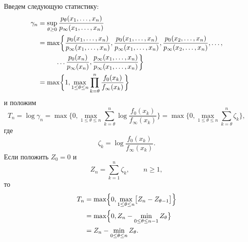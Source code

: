 Введем следующую статистику:
\begin{align}
\label{74}%
\gamma_n
 &
    =\sup_{\theta\ge0}\frac{p_{\theta}(x_1,\ldots,x_n)}{p_{\infty}(x_1,\ldots,x_n)}\notag\\
 &
    =\max
    \biggl\{
    \frac{p_{0}(x_1,\ldots,x_n)}{p_{\infty}(x_1,\ldots,x_n)},
    \frac{p_{0}(x_1,\ldots,x_n)}{p_{\infty}(x_1,\ldots,x_n)},
    \frac{p_{0}(x_2,\ldots,x_n)}{p_{\infty}(x_2,\ldots,x_n)},
    \ldots,\notag\\
 &\hphantom{\max\biggl\{}
    \ldots
    \frac{p_{0}(x_n)}{p_{\infty}(x_n)},
    \frac{p_{\infty}(x_1,\ldots,x_n)}{p_{\infty}(x_1,\ldots,x_n)}
    \biggr\}
    \notag\\
 &
    =\max
    \biggl\{
    1,
    \max_{1\le\theta\le n}\prod_{k=\theta}^n\frac{f_0(x_k)}{f_{\infty}(x_k)}
    \biggr\}
\end{align}
и положим
\[
T_n
    =\log\gamma_n
    =\max\biggl\{0,\max_{1\le\theta\le n}\sum_{k=\theta}^n\log 
    \frac{f_0(x_k)}{f_{\infty}(x_k)}\biggr\}
    =\max\biggl\{0,\max_{1\le\theta\le n}\sum_{k=\theta}^n\zeta_k\biggl\},
\]
где
\[
\zeta_k=\log\frac{f_0(x_k)}{f_{\infty}(x_k)}.
\]
Если положить $Z_0=0$ и
\[
    Z_n=\sum_{k=1}^n\zeta_k,
    \qquad
    n\ge1,
\]
то
\begin{align*}
T_n
 &
    =\max\Bigl\{0,\max_{1\le\theta\le n}\bigl[Z_n-Z_{\theta-1}\bigr]\Bigr\}\\
 &
    =\max\Bigl\{0,Z_n-\min_{0\le\theta\le n-1}Z_{\theta}\bigr\}\\
 &
    =Z_n-\min_{0\le\theta\le n}Z_{\theta}.
\end{align*}

